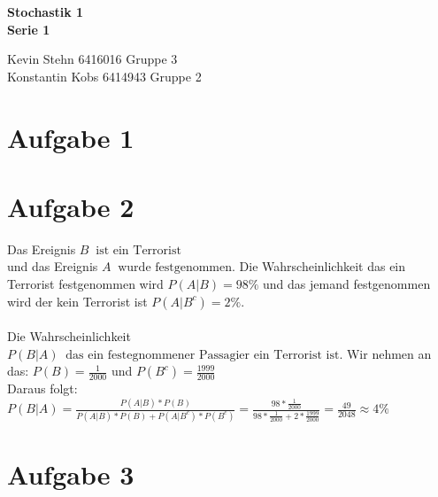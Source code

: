\documentclass[10pt,a4paper]{article}
\newcommand{\ent}{\mathop{\widehat{=}}}
\begin{document}
\begin{center}
\textbf{Stochastik 1 \\ Serie 1 \\}
\end{center}

\begin{flushright}
Kevin Stehn 6416016 Gruppe 3 \\
Konstantin Kobs 6414943 Gruppe 2
\end{flushright}

\section*{Aufgabe 1}

\section*{Aufgabe 2}
Das Ereignis $B \ent \text{ist ein Terrorist}$ \\ 
und das Ereignis $A \ent \text{wurde festgenommen}$.
Die Wahrscheinlichkeit das ein Terrorist festgenommen wird $P(A|B) = 98\% $ und das jemand festgenommen wird der kein Terrorist ist $P(A|B^{c})= 2\% $.\\\\
Die Wahrscheinlichkeit $P(B|A) \ent \text{das ein festegnommener Passagier ein Terrorist ist}$.
Wir nehmen an das: $P(B) = \frac{1}{2000}$ und $P(B^c)= \frac{1999}{2000}$ \\
Daraus folgt:\\
$P(B|A) = \frac{P(A|B)*P(B)}{P(A|B)*P(B) + P(A|B^c) * P(B^c)} = 
\frac{98*\frac{1}{2000}}{98*\frac{1}{2000}+ 2*\frac{1999}{2000}} = \frac{49}{2048} \approx 4\%$

\section*{Aufgabe 3}
\end{document}
